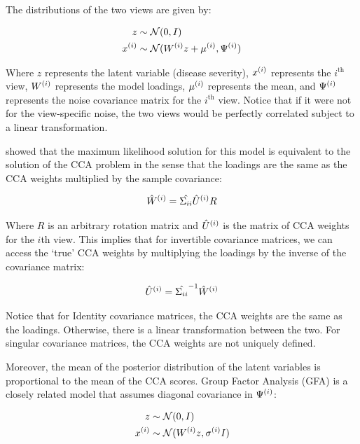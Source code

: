 The distributions of the two views are given by:

\begin{align}
    z& \sim \mathcal{N}(0, I)\\
    x^{(i)} & \sim \mathcal{N}(W^{(i)} z + \mu^{(i)}, \Psi^{(i)})
\end{align}

Where \(z\) represents the latent variable (disease severity), \(x^{(i)}\) represents the $i^{\text{th}}$ view, \(W^{(i)}\) represents the model loadings, \(\mu^{(i)}\) represents the mean, and \(\Psi^{(i)}\) represents the noise covariance matrix for the $i^{\text{th}}$ view. 
Notice that if it were not for the view-specific noise, the two views would be perfectly correlated subject to a linear transformation.

\citep{bach2005probabilistic} showed that the maximum likelihood solution for this model is equivalent to the solution of the CCA problem in the sense that the loadings are the same as the CCA weights multiplied by the sample covariance:

\begin{align}\label{eq:probabilistic-cca}
    \hat{W}^{(i)} = \hat{\Sigma_{ii}} \hat{U}^{(i)} R
\end{align}

Where $R$ is an arbitrary rotation matrix and $\hat{U}^{(i)}$ is the matrix of CCA weights for the $i$th view.
This implies that for invertible covariance matrices, we can access the `true' CCA weights by multiplying the loadings by the inverse of the covariance matrix:

\begin{align}
    \hat{U}^{(i)} = \hat{\Sigma_{ii}}^{-1} \hat{W}^{(i)}
\end{align}

Notice that for Identity covariance matrices, the CCA weights are the same as the loadings.
Otherwise, there is a linear transformation between the two.
For singular covariance matrices, the CCA weights are not uniquely defined.

Moreover, the mean of the posterior distribution of the latent variables is proportional to the mean of the CCA scores\citep{klami2013bayesian}.
Group Factor Analysis (GFA) is a closely related model that assumes diagonal covariance in $\Psi^{(i)}$:

\begin{align}
    z& \sim \mathcal{N}(0, I)\\
    x^{(i)} & \sim \mathcal{N}(W^{(i)} z, \sigma^{(i)}I)
\end{align}

